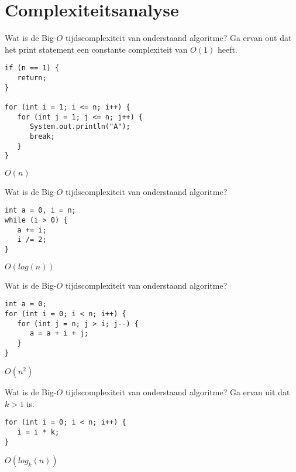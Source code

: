 \chapter{Complexiteitsanalyse}

\begin{oef}
\papier Wat is de Big-\(O\) tijdscomplexiteit van onderstaand algoritme? Ga ervan out dat het print statement een constante complexiteit van \(O(1)\) heeft.

\begin{lstlisting}
if (n == 1) {
   return;
}
   
for (int i = 1; i <= n; i++) {
   for (int j = 1; j <= n; j++) {
      System.out.println("A");
      break;
   }
}

\end{lstlisting}

\begin{opl}
\(O(n)\)
\end{opl}
\end{oef}

\begin{oef}
\papier Wat is de Big-\(O\) tijdscomplexiteit van onderstaand algoritme?

\begin{lstlisting}
int a = 0, i = n;
while (i > 0) {
   a += i;
   i /= 2;
}
\end{lstlisting}

\begin{opl}
\(O(log(n))\)
\end{opl}
\end{oef}

\break

\begin{oef}
\papier Wat is de Big-\(O\) tijdscomplexiteit van onderstaand algoritme?

\begin{lstlisting}
int a = 0;
for (int i = 0; i < n; i++) {
   for (int j = n; j > i; j--) {
      a = a + i + j;
   }
}
\end{lstlisting}

\begin{opl}
\(O(n^2)\)
\end{opl}
\end{oef}

\begin{oef}
\papier Wat is de Big-\(O\) tijdscomplexiteit van onderstaand algoritme? Ga ervan uit dat \(k > 1\) is.

\begin{lstlisting}
for (int i = 0; i < n; i++) {
   i = i * k;
}
\end{lstlisting}

\begin{opl}
\(O(log_k(n))\)
\end{opl}
\end{oef}

